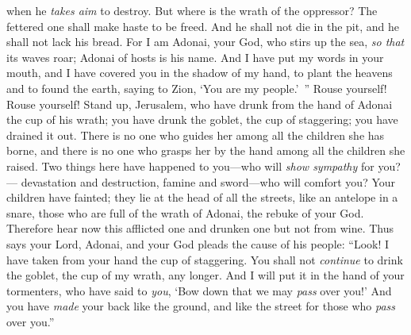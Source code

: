 \begin{biblechapter}
when he \textit{takes aim} to destroy. 
But where is the wrath of the oppressor?
\verse The fettered one shall make haste to be freed. 
And he shall not die in the pit, 
and he shall not lack his bread.
\verse For I am Adonai, your God, 
who stirs up the sea, \textit{so that} its waves roar; 
Adonai of hosts is his name.
\verse And I have put my words in your mouth, 
and I have covered you in the shadow of my hand, 
to plant the heavens 
and to found the earth, 
saying to Zion, ‘You are my people.’ ”
\verse Rouse yourself! Rouse yourself! 
Stand up, Jerusalem, who have drunk from the hand of Adonai the cup of his wrath; 
you have drunk the goblet, the cup of staggering; 
you have drained it out.
\verse There is no one who guides her among all the children she has borne, 
and there is no one who grasps her by the hand among all the children she raised.
\verse Two things here have happened to you—who will \textit{show sympathy} for you?— 
devastation and destruction, famine and sword—who will comfort you?
\verse Your children have fainted; 
they lie at the head of all the streets, like an antelope in a snare, 
those who are full of the wrath of Adonai, 
the rebuke of your God.
\verse Therefore hear now this afflicted one 
and drunken one but not from wine.
\verse Thus says your Lord, Adonai, 
and your God pleads the cause of his people: 
“Look! I have taken from your hand the cup of staggering. 
You shall not \textit{continue} to drink the goblet, the cup of my wrath, any longer.
\verse And I will put it in the hand of your tormenters, 
who have said to \textit{you}, ‘Bow down that we may \textit{pass} over you!’ 
And you have \textit{made} your back like the ground, 
and like the street for those who \textit{pass} over you.”
\end{biblechapter}

